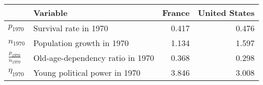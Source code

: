 
\begin{tabular}{llrr}
\toprule
\textbf{} & \textbf{Variable} & \textbf{France} & \textbf{United States}\\
\midrule
$p_{1970}$ & Survival rate in 1970 & 0.417 & 0.476\\
$n_{1970}$ & Population growth in 1970 & 1.134 & 1.597\\
$\frac{p_{1970}}{n_{1970}}$ & Old-age-dependency ratio in 1970 & 0.368 & 0.298\\
$\eta_{1970}$ & Young political power in 1970 & 3.846 & 3.008\\
\bottomrule
\end{tabular}
